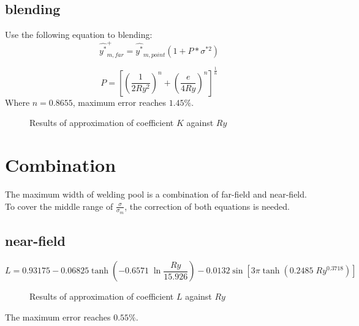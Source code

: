 \documentclass[review, 1p, number, sort&compress,table]{elsarticle}
\begin{document}
	\subsection{blending}
	Use the following equation to blending:
	\begin{equation} \label{eq:blending s/s}
	\widehat{y^*}_{m,far}^+=\widehat{y^*}_{m,point}\left(1+P*\sigma^{*2}\right)
	\end{equation}
	
	\begin{equation}
		P=\left[\left( \frac{1}{2Ry^{2}}\right)^n+  \left( \frac{e}{4Ry}\right)^n  \right]^{\frac{1}{n}}
	\end{equation}
	Where $n=0.8655$, maximum error reaches $1.45\%$.
		\begin{figure*}[ht!]
			\begin{center}
			\end{center}
			\caption{Results of approximation of coefficient $K$ against $Ry$  }
			\label{fig:A.PvR}
			
		\end{figure*}
		
	\section{Combination}
	The maximum width of welding pool is a combination of far-field and near-field. To cover the middle range of $\frac{\sigma}{\sigma_m}$, the correction of both equations is needed.
	\subsection{near-field }
	\begin{equation}  \label{eq:LvR}
    L=	0.93175-0.06825\tanh\left({-0.6571 \; \ln\dfrac{Ry}{15.926}}\right)-0.0132\sin\left[3{\pi}\tanh\left(0.2485 \; Ry^{0.3718}\right)\right]
	\end{equation}
	
		\begin{figure*}[ht!]
			\begin{center}
			\end{center}
			\caption{Results of approximation of coefficient $L$ against $Ry$  }
			\label{fig:A.LvR}
		\end{figure*}
   The maximum error reaches $0.55\%$. 
\end{document}
